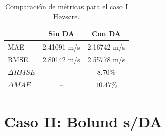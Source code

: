 \begin{table}[h!]
	\caption{Comparación de métricas para el caso I Høvsøre.}
	\label{tab:06_hov_mae_rmse}
	\centering%
	\begin{tabular}{lcc}
		\toprule
		& Sin DA & Con DA \\
		\midrule
		MAE & 2.41091 m/s & 2.16742 m/s \\
		RMSE & 2.80142 m/s& 2.55778 m/s\\
		$\Delta{RMSE}$& --  & $8.70\%$  \\
		$\Delta{MAE}$ & -- & $10.47\%$  \\
		\bottomrule
	\end{tabular}
\end{table}

















\newpage
\section{Caso II: Bolund s/DA}

